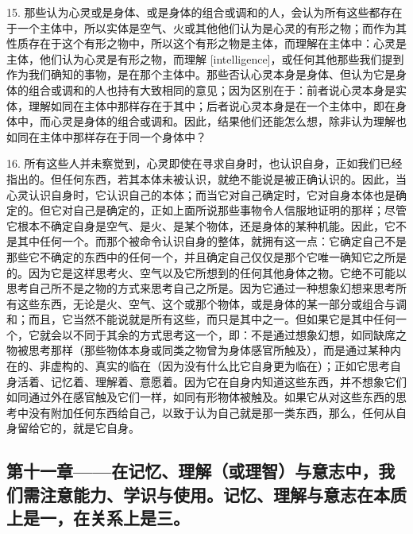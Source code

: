 15. 那些认为心灵或是身体、或是身体的组合或调和的人，会认为所有这些都存在于一个主体中，所以实体是空气、火或其他他们认为是心灵的有形之物；而作为其性质存在于这个有形之物中，所以这个有形之物是主体，而理解在主体中：心灵是主体，他们认为心灵是有形之物，而理解 [intelligence]，或任何其他那些我们提到作为我们确知的事物，是在那个主体中。那些否认心灵本身是身体、但认为它是身体的组合或调和的人也持有大致相同的意见；因为区别在于：前者说心灵本身是实体，理解如同在主体中那样存在于其中；后者说心灵本身是在一个主体中，即在身体中，而心灵是身体的组合或调和。因此，结果他们还能怎么想，除非认为理解也如同在主体中那样存在于同一个身体中？\par

16. 所有这些人并未察觉到，心灵即使在寻求自身时，也认识自身，正如我们已经指出的。但任何东西，若其本体未被认识，就绝不能说是被正确认识的。因此，当心灵认识自身时，它认识自己的本体；而当它对自己确定时，它对自身本体也是确定的。但它对自己是确定的，正如上面所说那些事物令人信服地证明的那样；尽管它根本不确定自身是空气、是火、是某个物体，还是身体的某种机能。因此，它不是其中任何一个。而那个被命令认识自身的整体，就拥有这一点：它确定自己不是那些它不确定的东西中的任何一个，并且确定自己仅仅是那个它唯一确知它之所是的。因为它是这样思考火、空气以及它所想到的任何其他身体之物。它绝不可能以思考自己所不是之物的方式来思考自己之所是。因为它通过一种想象幻想来思考所有这些东西，无论是火、空气、这个或那个物体，或是身体的某一部分或组合与调和；而且，它当然不能说就是所有这些，而只是其中之一。但如果它是其中任何一个，它就会以不同于其余的方式思考这一个，即：不是通过想象幻想，如同缺席之物被思考那样（那些物体本身或同类之物曾为身体感官所触及），而是通过某种内在的、非虚构的、真实的临在（因为没有什么比它自身更为临在）；正如它思考自身活着、记忆着、理解着、意愿着。因为它在自身内知道这些东西，并不想象它们如同通过外在感官触及它们一样，如同有形物体被触及。如果它从对这些东西的思考中没有附加任何东西给自己，以致于认为自己就是那一类东西，那么，任何从自身留给它的，就是它自身。\par


\subsection{第十一章——在记忆、理解（或理智）与意志中，我们需注意能力、学识与使用。记忆、理解与意志在本质上是一，在关系上是三。}

